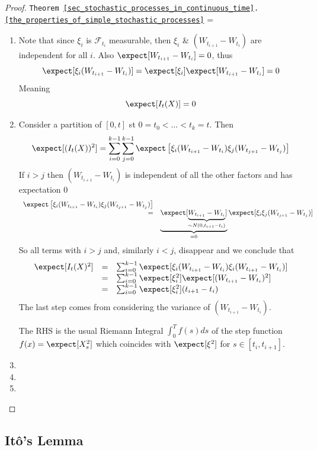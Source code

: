 \documentclass[11pt,a4paper]{article}
\begin{document}
  \begin{proof}{\texttt{Theorem \ref{sec_stochastic_processes_in_continuous_time}.\ref{the_properties_of_simple_stochastic_processes}}}
    \everymath={\displaystyle}
    \begin{enumerate}
      \item Note that since $\xi_i$ is $\mathcal{F}_{t_i}$ measurable, then $\xi_i$ \& $(W_{t_{i+1}}-W_{t_i})$ are independent for all $i$. Also $\expect[W_{t_{i+1}}-W_{t_i}]=0$, thus
      \[ \expect[\xi_i(W_{t_{i+1}}-W_{t_i})]=\expect[\xi_i]\expect[W_{t_{i+1}}-W_{t_i}]=0 \]
      Meaning
      \[ \expect[I_t(X)]=0 \]
      \item Consider a partition of $[0,t]$ st $0=t_0<\dots<t_k=t$. Then
      \[ \expect[(I_t(X))^2]=\sum_{i=0}^{k-1}\sum_{j=0}^{k-1}\expect\left[\xi_i(W_{t_{i+1}}-W_{t_i})\xi_j(W_{t_{j+1}}-W_{t_j})\right] \]
      If $i>j$ then $(W_{t_{i+1}}-W_{t_i})$ is independent of all the other factors and has expectation 0
      \[\begin{array}{rl}
        \expect\left[\xi_i(W_{t_{i+1}}-W_{t_i})\xi_j(W_{t_{j+1}}-W_{t_j})\right]\\
        =&\underbrace{\expect[\underbrace{W_{t_{i+1}}-W_{t_i}}_{\sim N(0,t_{i+1}-t_i)}]}_{=0}\expect[\xi_i\xi_j(W_{t_{j+1}}-W_{t_j})]
      \end{array}\]
      So all terms with $i>j$ and, similarly $i<j$, disappear and we conclude that
      \[\begin{array}{rcl}
        \expect[I_t(X)^2]&=&\sum_{i=0}^{k-1}\expect[\xi_i(W_{t_{i+1}}-W_{t_i})\xi_i(W_{t_{i+1}}-W_{t_i})]\\
        &=&\sum_{i=0}^{k-1}\expect[\xi_i^2]\expect[(W_{t_{i+1}}-W_{t_i})^2]\\
        &=&\sum_{i=0}^{k-1}\expect[\xi_i^2](t_{i+1}-t_i)
      \end{array}\]
      The last step comes from considering the variance of $(W_{t_{i+1}}-W_{t_i})$.
      \par The RHS is the usual Riemann Integral $\int_0^Tf(s)ds$ of the step function $f(x)=\expect[X_s^2]$ which coincides with $\expect[\xi^2]$ for $s\in[t_i,t_{i+1}]$.
      \item
      \item
      \item
    \end{enumerate}
  \end{proof}

\subsection{It\^o's Lemma}
\end{document}
